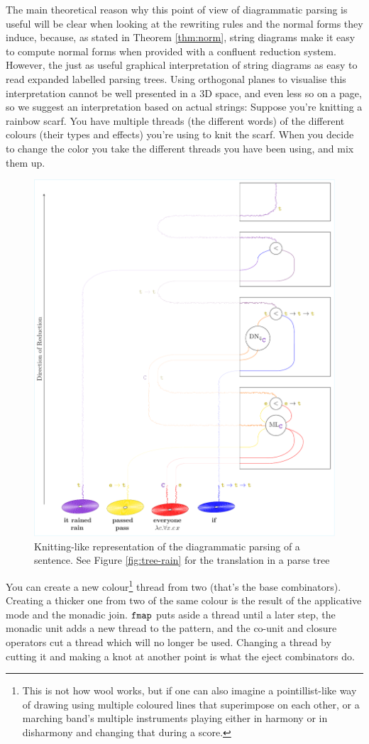 The main theoretical reason why this point of view of diagrammatic parsing is
useful will be clear when looking at the rewriting rules and the normal forms
they induce, because, as stated in Theorem \ref{thm:norm}, string
diagrams make it easy to compute normal forms when provided with a confluent
reduction system.
However, the just as useful graphical interpretation of string diagrams as
easy to read expanded labelled parsing trees.
Using orthogonal planes to visualise this interpretation cannot be well
presented in a 3D space, and even less so on a page, so we suggest an
interpretation based on actual strings:
Suppose you're knitting a rainbow scarf.
You have multiple threads (the different words) of the different colours (their
types and effects) you're using to knit the scarf.
When you decide to change the color you take the different threads you have
been using, and mix them up.

\begin{figure}
	\centering
	\includegraphics[width=.5\textwidth]{3d-parsing-diagram}
	\caption{Knitting-like representation of the diagrammatic parsing of a sentence. See Figure \ref{fig:tree-rain} for the translation in a parse tree}
	\label{fig:3dparsing-diagram}
\end{figure}

You can create a new colour\footnote{This is not how wool works, but
	if one can also imagine a pointillist-like way of drawing using multiple
	coloured lines that superimpose on each other, or a marching band's multiple
	instruments playing either in harmony or in disharmony and changing that
	during a score.} thread from two (that's the base combinators).
Creating a thicker one from two of the same colour is the result of the
applicative mode and the monadic join.
$\texttt{fmap}$ puts aside a thread until a later step, the monadic unit adds a new
thread to the pattern, and the co-unit and closure operators cut a thread which
will no longer be used.
Changing a thread by cutting it and making a knot at another point is what the
eject combinators do.

